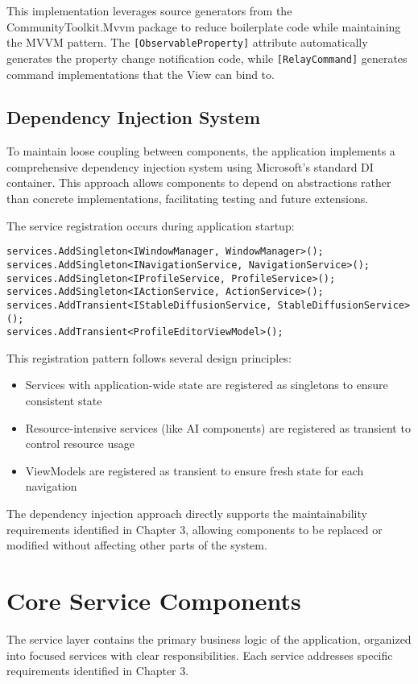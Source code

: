 This implementation leverages source generators from the CommunityToolkit.Mvvm package to reduce boilerplate code while maintaining the MVVM pattern. The \texttt{[ObservableProperty]} attribute automatically generates the property change notification code, while \texttt{[RelayCommand]} generates command implementations that the View can bind to.

\subsection{Dependency Injection System}
To maintain loose coupling between components, the application implements a comprehensive dependency injection system using Microsoft's standard DI container. This approach allows components to depend on abstractions rather than concrete implementations, facilitating testing and future extensions.

The service registration occurs during application startup:

\begin{verbatim}
services.AddSingleton<IWindowManager, WindowManager>();
services.AddSingleton<INavigationService, NavigationService>();
services.AddSingleton<IProfileService, ProfileService>();
services.AddSingleton<IActionService, ActionService>();
services.AddTransient<IStableDiffusionService, StableDiffusionService>();
services.AddTransient<ProfileEditorViewModel>();
\end{verbatim}

This registration pattern follows several design principles:

\begin{itemize}
    \item Services with application-wide state are registered as singletons to ensure consistent state
    \item Resource-intensive services (like AI components) are registered as transient to control resource usage
    \item ViewModels are registered as transient to ensure fresh state for each navigation
\end{itemize}

The dependency injection approach directly supports the maintainability requirements identified in Chapter 3, allowing components to be replaced or modified without affecting other parts of the system.

\section{Core Service Components}
The service layer contains the primary business logic of the application, organized into focused services with clear responsibilities. Each service addresses specific requirements identified in Chapter 3.

